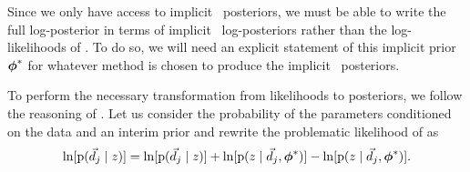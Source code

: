 
Since we only have access to implicit \pz\ posteriors, we must be able to write the full log-posterior in terms of implicit \pz\ log-posteriors rather than the log-likelihoods of .
To do so, we will need an explicit statement of this implicit prior ${\boldsymbol{\phi}}^{*}$ for whatever method is chosen to produce the implicit \pz\ posteriors.  

To perform the necessary transformation from likelihoods to posteriors, we follow the reasoning of \citet{Foreman-Mackey2014}.  
Let us consider the probability of the parameters conditioned on the data and an interim prior and rewrite the problematic likelihood of  as 
\begin{equation}
\eqlabel{eq:trick}
\ln[\pr{\data_{j} \gvn z}] = \ln[\pr{\data_{j} \gvn z}] + \ln[\pr{z \gvn \data_{j}, \ndphi^{*}}] - \ln[\pr{z \gvn \data_{j}, \ndphi^{*}}].
\end{equation}

